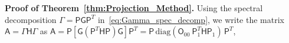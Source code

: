\documentclass[english,12pt,jmp,graphicx]{revtex4-1}
\newcommand{\thmref}[1]{Theorem~\ref{#1}}
\newcommand{\Hm}{\mathsf{H}}
\newcommand{\Am}{\mathsf{A}}
\newcommand{\Pm}{\mathsf{P}}
\newcommand{\Gm}{\mathsf{G}}
\newcommand{\Ib}{\mathsf{I}}
\newcommand{\Om}{\mathsf{O}}
\begin{document}
\noindent
\textbf{Proof of \thmref{thm:Projection_Method}.}
%
Using the spectral decomposition $\Gamma=\Pm\Gm\Pm^T$
in~\eqref{eq:Gamma_spec_decomp}, we write the  
matrix $\Am=\Gamma\Hm\Gamma$ as
$\Am=\Pm[\Gm(\Pm^T\Hm\Pm)\Gm]\Pm^T
=\Pm\,\text{diag}(\Om_{00}\ \Pm_1^T\Hm\Pm_1 )\,\Pm^T$,
\end{document}
